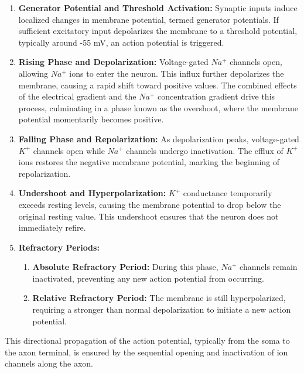 \begin{enumerate}
    \item \textbf{Generator Potential and Threshold Activation:} Synaptic inputs induce localized changes in membrane potential, termed generator potentials. If sufficient excitatory input depolarizes the membrane to a threshold potential, typically around -55 mV, an action potential is triggered.
    \item \textbf{Rising Phase and Depolarization:} Voltage-gated $Na^{+}$ channels open, allowing $Na^{+}$ 
    ions to enter the neuron. This influx further depolarizes the membrane, causing a rapid shift toward positive values.
    The combined effects of the electrical gradient and the $Na^{+}$ concentration gradient drive this process, culminating in a phase known as the overshoot, where the membrane potential momentarily becomes positive.
    \item \textbf{Falling Phase and Repolarization:} As depolarization peaks, voltage-gated $K^{+}$ channels 
    open while $Na^{+}$ channels undergo inactivation. The efflux of $K^{+}$ ions restores the negative membrane potential, marking the beginning of repolarization.
    \item \textbf{Undershoot and Hyperpolarization:} $K^{+}$ conductance temporarily exceeds resting levels, causing the membrane potential to drop below the original resting value. This undershoot ensures that the neuron does not immediately refire.
    \item \textbf{Refractory Periods:}
    \begin{enumerate}
        \item \textbf{Absolute Refractory Period:} During this phase, $Na^{+}$ channels remain inactivated, preventing any 
        new action potential from occurring.
        \item \textbf{Relative Refractory Period:} The membrane is still hyperpolarized, requiring a stronger than normal depolarization to initiate a new action potential.
    \end{enumerate}
\end{enumerate}

This directional propagation of the action potential, typically from the soma to the axon terminal, is ensured
by the sequential opening and inactivation of ion channels along the axon.

